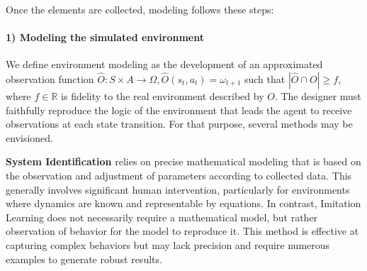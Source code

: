 \documentclass[sigconf,anonymous]{aamas}
\begin{document}
Once the elements are collected, modeling follows these steps: 


\paragraph{\textbf{1) Modeling the simulated environment}} \quad

\noindent We define environment modeling as the development of an approximated observation function $\hat{O}: S \times A \to \Omega, \hat{O}(s_t,a_t) = \omega_{t+1}$ such that $|\hat{O} \cap O| \geq f$, where $f \in \mathbb{R}$ is fidelity to the real environment described by $O$.
The designer must faithfully reproduce the logic of the environment that leads the agent to receive observations at each state transition. 
For that purpose, several methods may be envisioned.

\textbf{System Identification} relies on precise mathematical modeling that is based on the observation and adjustment of parameters according to collected data. This generally involves significant human intervention, particularly for environments where dynamics are known and representable by equations. In contrast, Imitation Learning does not necessarily require a mathematical model, but rather observation of behavior for the model to reproduce it. This method is effective at capturing complex behaviors but may lack precision and require numerous examples to generate robust results.
\end{document}
